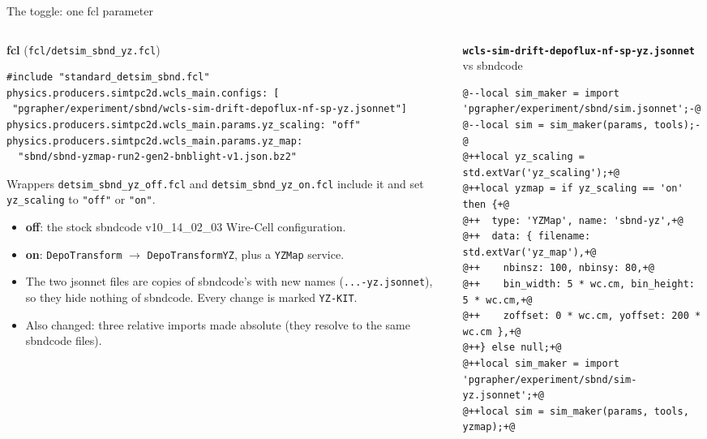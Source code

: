 \documentclass[aspectratio=169,10pt]{beamer}
\newcommand{\code}[1]{\texttt{#1}}
\begin{document}
\begin{frame}[fragile]{The toggle: one fcl parameter}
\lstset{basicstyle=\ttfamily\tiny}
\begin{columns}[T]
\begin{column}{0.48\textwidth}
\footnotesize
\textbf{fcl} (\code{fcl/detsim\_sbnd\_yz.fcl})
\begin{lstlisting}
#include "standard_detsim_sbnd.fcl"
physics.producers.simtpc2d.wcls_main.configs: [
 "pgrapher/experiment/sbnd/wcls-sim-drift-depoflux-nf-sp-yz.jsonnet"]
physics.producers.simtpc2d.wcls_main.params.yz_scaling: "off"
physics.producers.simtpc2d.wcls_main.params.yz_map:
  "sbnd/sbnd-yzmap-run2-gen2-bnblight-v1.json.bz2"
\end{lstlisting}
Wrappers \code{detsim\_sbnd\_yz\_off.fcl} and \code{detsim\_sbnd\_yz\_on.fcl} include it and set \code{yz\_scaling} to \code{"off"} or \code{"on"}.
\vspace{2mm}
\begin{itemize}
\item \textbf{off}: the stock sbndcode v10\_14\_02\_03 Wire-Cell configuration.
\item \textbf{on}: \code{DepoTransform} $\to$ \code{DepoTransformYZ}, plus a \code{YZMap} service.
\item The two jsonnet files are copies of sbndcode's with new names (\code{...-yz.jsonnet}), so they hide nothing of sbndcode. Every change is marked \code{YZ-KIT}.
\item Also changed: three relative imports made absolute (they resolve to the same sbndcode files).
\end{itemize}
\end{column}
\begin{column}{0.5\textwidth}
\footnotesize
\textbf{\code{wcls-sim-drift-depoflux-nf-sp-yz.jsonnet}} vs sbndcode
\begin{lstlisting}[style=diff]
@--local sim_maker = import 'pgrapher/experiment/sbnd/sim.jsonnet';-@
@--local sim = sim_maker(params, tools);-@
@++local yz_scaling = std.extVar('yz_scaling');+@
@++local yzmap = if yz_scaling == 'on' then {+@
@++  type: 'YZMap', name: 'sbnd-yz',+@
@++  data: { filename: std.extVar('yz_map'),+@
@++    nbinsz: 100, nbinsy: 80,+@
@++    bin_width: 5 * wc.cm, bin_height: 5 * wc.cm,+@
@++    zoffset: 0 * wc.cm, yoffset: 200 * wc.cm },+@
@++} else null;+@
@++local sim_maker = import 'pgrapher/experiment/sbnd/sim-yz.jsonnet';+@
@++local sim = sim_maker(params, tools, yzmap);+@
\end{lstlisting}

\end{column}
\end{columns}
\end{frame}
\end{document}
